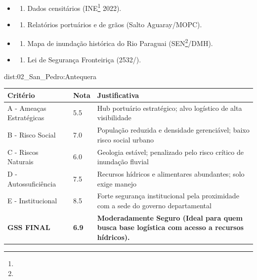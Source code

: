 {\begin{itemize}
\tightlist
\item
  \begin{enumerate}
  \def\labelenumi{\arabic{enumi})}
  \tightlist
  \item
    Dados censitários (INE\footnote{\fineINE} 2022).
  \end{enumerate}
\item
  \begin{enumerate}
  \def\labelenumi{\arabic{enumi})}
  \setcounter{enumi}{1}
  \tightlist
  \item
    Relatórios portuários e de grãos (Salto Aguaray/\allowbreak MOPC).
  \end{enumerate}
\item
  \begin{enumerate}
  \def\labelenumi{\arabic{enumi})}
  \setcounter{enumi}{2}
  \tightlist
  \item
    Mapa de inundação histórica do Rio Paraguai (SEN\footnote{\fineSEN}/\allowbreak DMH).
  \end{enumerate}
\item
  \begin{enumerate}
  \def\labelenumi{\arabic{enumi})}
  \setcounter{enumi}{3}
  \tightlist
  \item
    Lei de Segurança Fronteiriça (2532/).
  \end{enumerate}
\end{itemize}}{dist:02_San_Pedro:Antequera}
\begin{table}[ht!]
\small \begin{tabular}{p{3.0cm}p{0.8cm}p{6.0cm}} \toprule
\textbf{Critério} & \textbf{Nota} & \textbf{Justificativa} \\ \midrule
A - Ameaças Estratégicas & 5.5 & Hub portuário estratégico; alvo logístico de alta visibilidade \\
B - Risco Social & 7.0 & População reduzida e densidade gerenciável; baixo risco social urbano \\
C - Riscos Naturais & 6.0 & Geologia estável; penalizado pelo risco crítico de inundação fluvial \\
D - Autossuficiência & 7.5 & Recursos hídricos e alimentares abundantes; solo exige manejo \\
E - Institucional & 8.5 & Forte segurança institucional pela proximidade com a sede do governo departamental \\
\midrule \textbf{GSS FINAL} & \textbf{6.9} & \textbf{Moderadamente Seguro (Ideal para quem busca base logística com acesso a recursos hídricos).} \\ \bottomrule \end{tabular}
\end{table}
